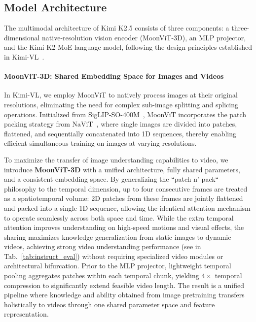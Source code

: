 \documentclass{article}
\newcommand{\citep}[1]{\parencite{#1}}
\begin{document}
\subsection{Model Architecture}

The multimodal architecture of Kimi K2.5 consists of three components: a three-dimensional native-resolution vision encoder (MoonViT-3D), an MLP projector, and the Kimi K2 MoE language model, following the design principles established in Kimi-VL~\citep{team2025kimivl}.

\paragraph{MoonViT-3D: Shared Embedding Space for Images and Videos}

In Kimi-VL, we employ MoonViT to natively process images at their original resolutions, eliminating the need for complex sub-image splitting and splicing operations. Initialized from SigLIP-SO-400M~\citep{zhai2023sigmoidlosslanguageimage}, MoonViT incorporates the patch packing strategy from NaViT~\citep{dehghani2023patchnpacknavit}, where single images are divided into patches, flattened, and sequentially concatenated into 1D sequences, thereby enabling efficient simultaneous training on images at varying resolutions.

To maximize the transfer of image understanding capabilities to video, we introduce \textbf{MoonViT-3D} with a unified architecture, fully shared parameters, and a consistent embedding space. By generalizing the ``patch n' pack`` philosophy to the temporal dimension, up to four consecutive frames are treated as a spatiotemporal volume: 2D patches from these frames are jointly flattened and packed into a single 1D sequence, allowing the identical attention mechanism to operate seamlessly across both space and time. While the extra temporal attention improves understanding on high-speed motions and visual effects, the sharing maximizes knowledge generalization from static images to dynamic videos, achieving strong video understanding performance (see in Tab.~\ref{tab:instruct_eval}) without requiring specialized video modules or architectural bifurcation. Prior to the MLP projector, lightweight temporal pooling aggregates patches within each temporal chunk, yielding $4\times$ temporal compression to significantly extend feasible video length. The result is a unified pipeline where knowledge and ability obtained from image pretraining transfers holistically to videos through one shared parameter space and feature representation.
\end{document}
